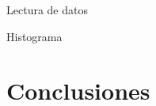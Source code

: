 \documentclass[a4paper,11pt]{book}\usepackage[]{graphicx}\usepackage[]{color}
\theoremstyle{plain}
\theoremstyle{definition}
\begin{document}

Lectura de datos


Histograma



\chapter{Conclusiones} 

%
%
%
%
%
%
\chapter*{}
\thispagestyle{empty}

{}

\end{document}
